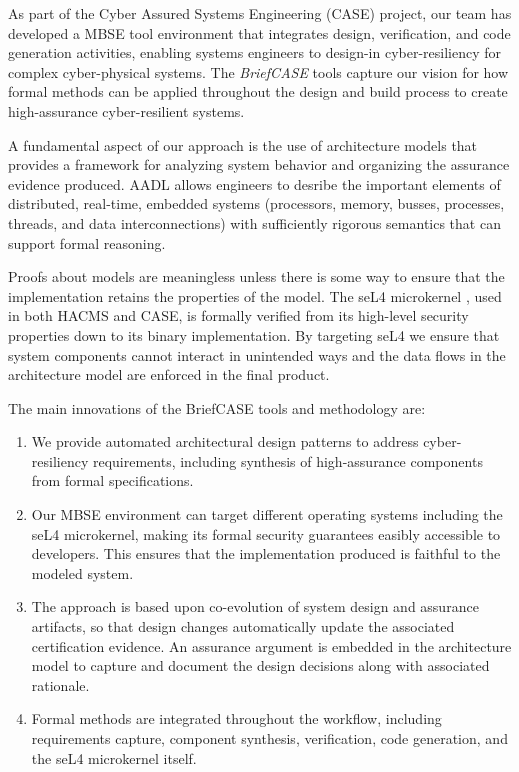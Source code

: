 As part of the Cyber Assured Systems Engineering (CASE) project,
our team has developed a MBSE tool environment that integrates design, verification,
and code generation activities, enabling systems engineers to design-in cyber-resiliency
for complex cyber-physical systems. The {\em BriefCASE} tools capture our 
vision for how formal methods can be applied throughout the design and build process 
to create high-assurance cyber-resilient systems.  

A fundamental aspect of our approach is the use of 
architecture models that provides a framework for analyzing
system behavior and organizing the assurance evidence produced.  
AADL allows engineers to desribe the important elements of distributed,
real-time, embedded systems (processors, memory, busses, processes, 
threads, and data interconnections) with sufficiently rigorous semantics
that can support formal reasoning.  

Proofs about models are meaningless unless there is some way to ensure
that the implementation retains the properties of the model.  The seL4 
microkernel \cite{sel4-sosp09}, used in both HACMS and CASE, is
formally verified from its high-level security properties down to its binary implementation.  
By targeting seL4 we ensure that system components cannot interact in unintended 
ways and the data flows in the architecture model are enforced in the
final product.  

The main innovations of the BriefCASE tools and methodology are:

\begin{enumerate}

\item We provide automated architectural design patterns to address cyber-resiliency requirements, 
including synthesis of high-assurance components from formal specifications.

\item Our MBSE environment can target different operating systems including the seL4 microkernel, 
making its formal security guarantees easibly accessible to developers. This ensures that 
the implementation produced is faithful to the modeled system. 

\item The approach is based upon co-evolution of system design and assurance artifacts, so that
design changes automatically update the associated certification evidence. An assurance argument
is embedded in the architecture model to capture and document the design decisions 
along with associated rationale.

\item Formal methods are integrated throughout the workflow, including requirements capture,
component synthesis, verification, code generation, and the seL4 microkernel itself. 

\end{enumerate}




